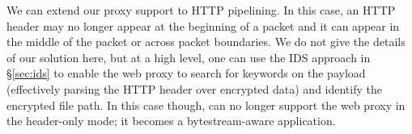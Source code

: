 We can extend our proxy support to HTTP pipelining. %
In this case,  an HTTP header may no longer appear at the beginning of a packet and it can appear in the middle of the packet or across packet boundaries. We do not give the details of our solution here, but at a high level, one can use the IDS approach in \S\ref{sec:ids} to enable the web proxy to search for keywords on the payload  (effectively parsing the HTTP header over encrypted data) and identify the encrypted file path. In this case though, \sys can no longer support the web proxy in the header-only mode; it becomes a bytestream-aware application. 


%
%
% 
%
%









%
%




